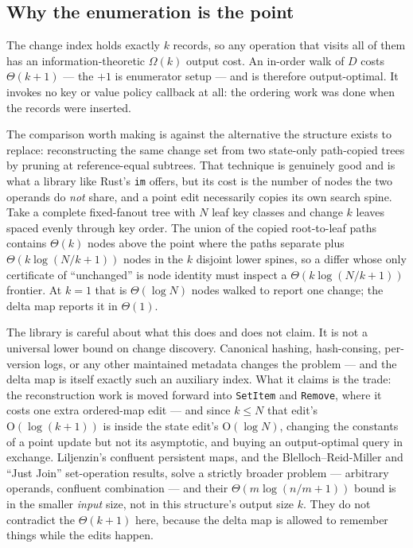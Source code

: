 \documentclass[11pt,twoside,openright]{book}
\newcommand{\code}[1]{\texorpdfstring{\textcolor{d7ink}{\texttt{#1}}}{#1}}
\newcommand{\bigoh}[1]{$\mathrm{O}(#1)$}
\begin{document}
\subsection{Why the enumeration is the point}

The change index holds exactly $k$ records, so any operation that visits all of
them has an information-theoretic $\Omega(k)$ output cost. An in-order walk of
$D$ costs $\Theta(k + 1)$ --- the $+1$ is enumerator setup --- and is therefore
output-optimal. It invokes no key or value policy callback
at all: the ordering work was done when the records were inserted.

The comparison worth making is against the alternative the structure exists to
replace: reconstructing the same change set from two state-only path-copied
trees by pruning at reference-equal subtrees. That technique is genuinely good
and is what a library like Rust's \code{im} offers, but its cost is the number
of nodes the two operands do \emph{not} share, and a point edit necessarily
copies its own search spine. Take a complete fixed-fanout tree with $N$ leaf key
classes and change $k$ leaves spaced evenly through key order. The union of the
copied root-to-leaf paths contains $\Theta(k)$ nodes above the point where the
paths separate plus $\Theta(k \log(N/k + 1))$ nodes in the $k$ disjoint lower
spines, so a differ whose only certificate of ``unchanged'' is node identity
must inspect a $\Theta(k \log(N/k + 1))$ frontier. At $k = 1$ that is
$\Theta(\log N)$ nodes walked to report one change; the delta map reports it in
$\Theta(1)$.

The library is careful about what this does and does not claim. It is not a
universal lower bound on change discovery. Canonical hashing, hash-consing,
per-version logs, or any other maintained metadata changes the problem --- and
the delta map is itself exactly such an auxiliary index. What it claims is the
trade: the reconstruction work is moved forward into \code{SetItem} and
\code{Remove}, where it costs one extra ordered-map edit --- and since $k \leq N$
that edit's \bigoh{\log(k + 1)} is inside the state edit's \bigoh{\log N},
changing the constants of a point update but not its asymptotic, and buying an
output-optimal query in exchange. Liljenzin's confluent persistent maps, and the
Blelloch--Reid-Miller and ``Just Join'' set-operation results, solve a strictly
broader problem --- arbitrary operands, confluent combination --- and their
$\Theta(m \log(n/m + 1))$ bound is in the smaller \emph{input} size, not in this
structure's output size $k$. They do not contradict the $\Theta(k + 1)$ here,
because the delta map is allowed to remember things while the edits happen.
\end{document}
